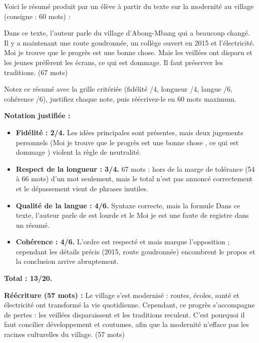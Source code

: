 \documentclass[11pt]{article}
\begin{document}
\begin{exercice}
Voici le résumé produit par un élève à partir du texte sur la modernité au village (consigne : 60 mots) :

\og Dans ce texte, l'auteur parle du village d'Abong-Mbang qui a beaucoup changé. Il y a maintenant une route goudronnée, un collège ouvert en 2015 et l'électricité. Moi je trouve que le progrès est une bonne chose. Mais les veillées ont disparu et les jeunes préfèrent les écrans, ce qui est dommage. Il faut préserver les traditions. \fg{} (67 mots)

Notez ce résumé avec la grille critériée (fidélité /4, longueur /4, langue /6, cohérence /6), justifiez chaque note, puis réécrivez-le en 60 mots maximum.
\end{exercice}

\begin{corrige}
\textbf{Notation justifiée :}
\begin{itemize}
\item \textbf{Fidélité : 2/4.} Les idées principales sont présentes, mais deux jugements personnels (\og Moi je trouve que le progrès est une bonne chose \fg{}, \og ce qui est dommage \fg{}) violent la règle de neutralité.
\item \textbf{Respect de la longueur : 3/4.} 67 mots : hors de la marge de tolérance (54 à 66 mots) d'un mot seulement, mais le total n'est pas annoncé correctement et le dépassement vient de phrases inutiles.
\item \textbf{Qualité de la langue : 4/6.} Syntaxe correcte, mais la formule \og Dans ce texte, l'auteur parle de \fg{} est lourde et le \og Moi je \fg{} est une faute de registre dans un résumé.
\item \textbf{Cohérence : 4/6.} L'ordre est respecté et \og mais \fg{} marque l'opposition ; cependant les détails précis (2015, route goudronnée) encombrent le propos et la conclusion arrive abruptement.
\end{itemize}
\textbf{Total : 13/20.}

\textbf{Réécriture (57 mots) :} \og Le village s'est modernisé : routes, écoles, santé et électricité ont transformé la vie quotidienne. Cependant, ce progrès s'accompagne de pertes : les veillées disparaissent et les traditions reculent. C'est pourquoi il faut concilier développement et coutumes, afin que la modernité n'efface pas les racines culturelles du village. \fg{} (57 mots)
\end{corrige}
\end{document}
